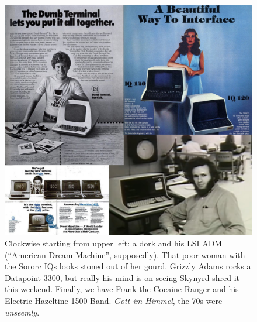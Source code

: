\documentclass[letterpaper,10pt]{article}
\begin{document}
\begin{appendices}
\begin{figure}
  \centering \includegraphics[width=.9\linewidth]{media/dumbterminals.jpg}
\caption[Dumb terminals of the 1970s.]{Clockwise starting from upper left: a dork and his LSI ADM (``American
  Dream Machine'', supposedly). That poor woman with the Sororc IQs looks stoned out
  of her gourd. Grizzly Adams rocks a Datapoint 3300, but really his mind is on
  seeing Skynyrd shred it this weekend. Finally, we have Frank the Cocaine
  Ranger and his Electric Hazeltine 1500 Band. \textit{Gott im Himmel}, the 70s were \textit{unseemly}.}
\label{fig:terminals}
\end{figure}


\end{appendices}
\end{document}
